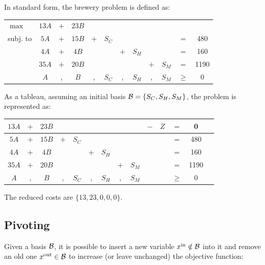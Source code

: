 \begin{example}
    In standard form, the brewery problem is defined as:
    \begin{center}
        \begin{tabular}{lccccccccccc}
            $\max$ & $13A$ & $+$ & $23B$ \\
            subj. to & $5A$ & $+$ & $15B$ & $+$ & $S_C$ & & & & & $=$ & 480 \\
                & $4A$ & $+$ & $4B$ & & & $+$ & $S_H$ & & & $=$ & 160 \\
                & $35A$ & $+$ & $20B$ & & & & & $+$ & $S_M$ & $=$ & 1190 \\
                & $A$ & , & $B$ & , & $S_C$ & , & $S_H$ & , & $S_M$ & $\geq$ & 0 \\
        \end{tabular}
    \end{center}

    As a tableau, assuming an initial basis $\mathcal{B} = \{ S_C, S_H, S_M \}$, the problem is represented as:
    \begin{center}
        \begin{tabular}{cccccccccccccc}
            \toprule
            $13A$ & $+$ & $23B$ & & & & & & & $-$ & $Z$ & $=$ & 0 \\
            \midrule
            $5A$ & $+$ & $15B$ & $+$ & $S_C$ & & & & & & & $=$ & 480 \\
            $4A$ & $+$ & $4B$ & & & $+$ & $S_H$ & & & & & $=$ & 160 \\
            $35A$ & $+$ & $20B$ & & & & & $+$ & $S_M$ & & & $=$ & 1190 \\
            \midrule
            $A$ & , & $B$ & , & $S_C$ & , & $S_H$ & , & $S_M$ & & & $\geq$ & 0 \\
            \bottomrule
        \end{tabular}
    \end{center}
    The reduced costs are $\{ 13, 23, 0, 0, 0 \}$.
\end{example}


\subsection{Pivoting}

Given a basis $\mathcal{B}$, it is possible to insert a new variable $x^\text{in} \notin \mathcal{B}$ into it and remove an old one $x^\text{out} \in \mathcal{B}$ 
to increase (or leave unchanged) the objective function:

